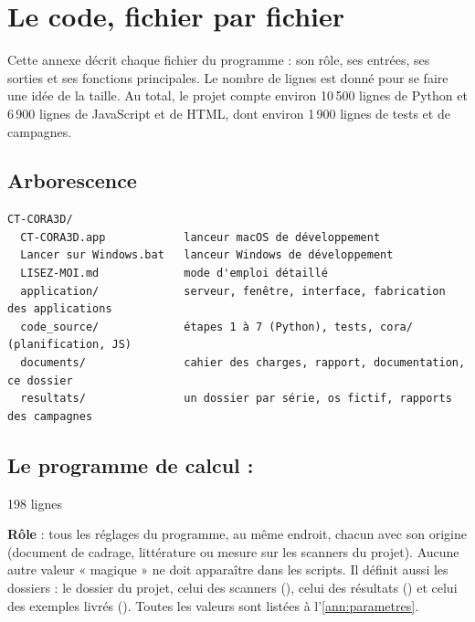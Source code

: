 \chapter{Le code, fichier par fichier}
\label{ann:code}

\begin{chapeau}
Cette annexe décrit chaque fichier du programme : son rôle, ses entrées, ses sorties et ses fonctions principales. Le
nombre de lignes est donné pour se faire une idée de la taille. Au total, le projet compte environ 10\,500 lignes de
Python et 6\,900 lignes de JavaScript et de HTML, dont environ 1\,900 lignes de tests et de campagnes.
\end{chapeau}

\newcommand{\fiche}[2]{\par\bigskip\noindent{\sffamily\bfseries\color{titre}\fichier{#1}}\hfill{\small\sffamily\color{gris}#2}\par\nopagebreak\smallskip}

\section{Arborescence}

\begin{lstlisting}[language={}, basicstyle=\ttfamily\footnotesize]
CT-CORA3D/
  CT-CORA3D.app            lanceur macOS de développement
  Lancer sur Windows.bat   lanceur Windows de développement
  LISEZ-MOI.md             mode d'emploi détaillé
  application/             serveur, fenêtre, interface, fabrication des applications
  code_source/             étapes 1 à 7 (Python), tests, cora/ (planification, JS)
  documents/               cahier des charges, rapport, documentation, ce dossier
  resultats/               un dossier par série, os fictif, rapports des campagnes
\end{lstlisting}

\section{Le programme de calcul : \texorpdfstring{}{code\_source/}}

\fiche{parametres.py}{198 lignes}
\textbf{Rôle} : tous les réglages du programme, au même endroit, chacun avec son origine (document de cadrage,
littérature ou mesure sur les scanners du projet). Aucune autre valeur « magique » ne doit apparaître dans les scripts.
Il définit aussi les dossiers : le dossier du projet, celui des scanners (), celui des résultats
() et celui des exemples livrés (). Toutes les valeurs sont listées à l'\cref{ann:parametres}.

